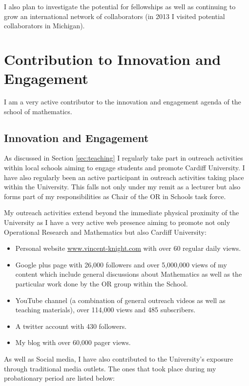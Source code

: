 \documentclass{article}
\begin{document}
I also plan to investigate the potential for fellowships as well as continuing to grow an international network of collaborators (in 2013 I visited potential collaborators in Michigan).

\section{Contribution to Innovation and Engagement}\label{sec:innovation}

I am a very active contributor to the innovation and engagement agenda of the school of mathematics.

\subsection{Innovation and Engagement}

As discussed in Section \ref{sec:teaching} I regularly take part in outreach activities within local schools aiming to engage students and promote Cardiff University.
I have also regularly been an active participant in outreach activities taking place within the University.
This falls not only under my remit as a lecturer but also forms part of my responsibilities as Chair of the OR in Schools task force.

My outreach activities extend beyond the immediate physical proximity of the University as I have a very active web presence aiming to promote not only Operational Research and Mathematics but also Cardiff University:

\begin{itemize}
    \item Personal website \url{www.vincent-knight.com} with over 60 regular daily views.
    \item Google plus page with 26,000 followers and over 5,000,000 views of my content which include general discussions about Mathematics as well as the particular work done by the OR group within the School.
    \item YouTube channel (a combination of general outreach videos as well as teaching materials), over 114,000 views and 485 subscribers.
    \item A twitter account with 430 followers.
    \item My blog with over 60,000 pager views.
\end{itemize}

As well as Social media, I have also contributed to the University's exposure through traditional media outlets.
The ones that took place during my probationary period are listed below:
\end{document}
